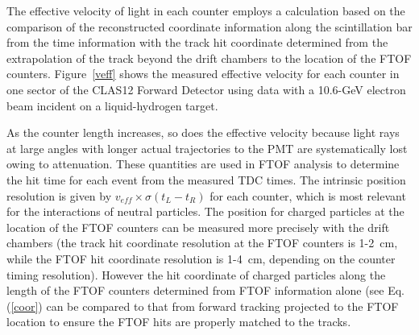 \documentclass{elsart}
\begin{document}
The effective velocity of light in each counter employs a calculation based on the comparison of the
reconstructed coordinate information along the scintillation bar from the time information with
the track hit coordinate determined from the extrapolation of the track beyond the drift chambers
to the location of the FTOF counters. Figure~\ref{veff} shows the measured effective velocity for
each counter in one sector of the CLAS12 Forward Detector using data with a 10.6-GeV electron
beam incident on a liquid-hydrogen target. 

As the counter length increases, so does the effective velocity because light rays at large angles with
longer actual trajectories to the PMT are systematically lost owing to attenuation. These quantities are
used in FTOF analysis to determine the hit time for each event from the measured TDC times. The
intrinsic position resolution is given by $v_{eff} \times \sigma(t_L - t_R)$ for each counter, which is
most relevant for the interactions of neutral particles. The position for charged particles at the location
of the FTOF counters can be measured more precisely with the drift chambers (the track hit coordinate
resolution at the FTOF counters is 1-2~cm, while the FTOF hit coordinate resolution is 1-4~cm, depending
on the counter timing resolution). However the hit coordinate of charged particles along the length of the
FTOF counters determined from FTOF information alone (see Eq.(\ref{coor}) can be compared to that from
forward tracking projected to the FTOF location to ensure the FTOF hits are properly matched to the tracks.
\end{document}
